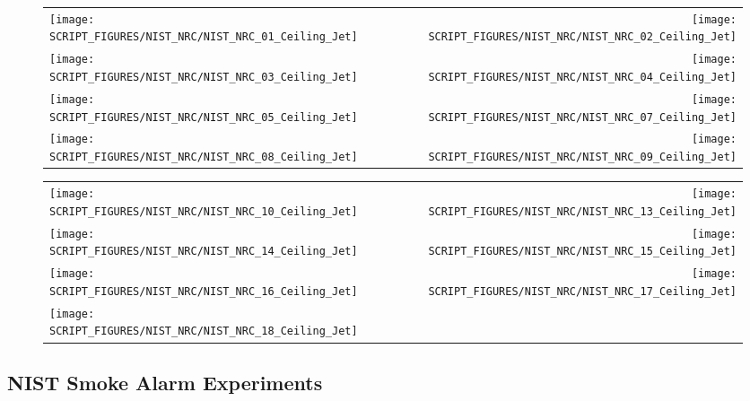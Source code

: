 \begin{figure}[!ht]
\begin{tabular*}{\textwidth}{l@{\extracolsep{\fill}}r}
\texttt{[image: SCRIPT\_FIGURES/NIST\_NRC/NIST\_NRC\_01\_Ceiling\_Jet]} &
\texttt{[image: SCRIPT\_FIGURES/NIST\_NRC/NIST\_NRC\_02\_Ceiling\_Jet]} \\
\texttt{[image: SCRIPT\_FIGURES/NIST\_NRC/NIST\_NRC\_03\_Ceiling\_Jet]} &
\texttt{[image: SCRIPT\_FIGURES/NIST\_NRC/NIST\_NRC\_04\_Ceiling\_Jet]} \\
\texttt{[image: SCRIPT\_FIGURES/NIST\_NRC/NIST\_NRC\_05\_Ceiling\_Jet]} &
\texttt{[image: SCRIPT\_FIGURES/NIST\_NRC/NIST\_NRC\_07\_Ceiling\_Jet]} \\
\texttt{[image: SCRIPT\_FIGURES/NIST\_NRC/NIST\_NRC\_08\_Ceiling\_Jet]} &
\texttt{[image: SCRIPT\_FIGURES/NIST\_NRC/NIST\_NRC\_09\_Ceiling\_Jet]}
\end{tabular*}
\end{figure}

\begin{figure}[!ht]
\begin{tabular*}{\textwidth}{l@{\extracolsep{\fill}}r}
\texttt{[image: SCRIPT\_FIGURES/NIST\_NRC/NIST\_NRC\_10\_Ceiling\_Jet]} &
\texttt{[image: SCRIPT\_FIGURES/NIST\_NRC/NIST\_NRC\_13\_Ceiling\_Jet]} \\
\texttt{[image: SCRIPT\_FIGURES/NIST\_NRC/NIST\_NRC\_14\_Ceiling\_Jet]} &
\texttt{[image: SCRIPT\_FIGURES/NIST\_NRC/NIST\_NRC\_15\_Ceiling\_Jet]} \\
\texttt{[image: SCRIPT\_FIGURES/NIST\_NRC/NIST\_NRC\_16\_Ceiling\_Jet]} &
\texttt{[image: SCRIPT\_FIGURES/NIST\_NRC/NIST\_NRC\_17\_Ceiling\_Jet]} \\
\texttt{[image: SCRIPT\_FIGURES/NIST\_NRC/NIST\_NRC\_18\_Ceiling\_Jet]}
\end{tabular*}
\end{figure}

\clearpage

\subsection{NIST Smoke Alarm Experiments}

